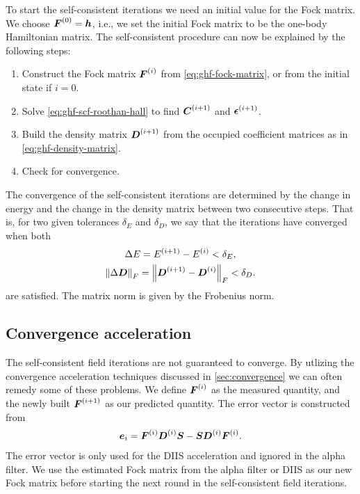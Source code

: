             To start the self-consistent iterations we need an initial value for
            the Fock matrix.
            We choose $\boldsymbol{F}^{(0)} = \boldsymbol{h}$, i.e., we set the initial
            Fock matrix to be the one-body Hamiltonian matrix.
            The self-consistent procedure can now be explained by the following
            steps:
            \begin{enumerate}
                \item Construct the Fock matrix $\boldsymbol{F}^{(i)}$ from
                    \autoref{eq:ghf-fock-matrix}, or from the initial state if
                    $i = 0$.
                \item Solve \autoref{eq:ghf-scf-roothan-hall} to find
                    $\boldsymbol{C}^{(i + 1)}$ and $\boldsymbol{\epsilon}^{(i + 1)}$.
                \item Build the density matrix $\boldsymbol{D}^{(i + 1)}$ from the
                    occupied coefficient matrices as in
                    \autoref{eq:ghf-density-matrix}.
                \item Check for convergence.
            \end{enumerate}
            The convergence of the self-consistent iterations are determined by
            the change in energy and the change in the density matrix between
            two consecutive steps.
            That is, for two given tolerances $\delta_E$ and $\delta_D$, we say
            that the iterations have converged when both
            \begin{gather}
                \Delta E
                = E^{(i + 1)} - E^{(i)} < \delta_E,
                \\
                \norm{\Delta \boldsymbol{D}}_{F}
                = \norm{\boldsymbol{D}^{(i + 1)} - \boldsymbol{D}^{(i)}}_{F}
                < \delta_D.
            \end{gather}
            are satisfied.
            The matrix norm is given by the Frobenius norm.

        \subsection{Convergence acceleration}
            The self-consistent field iterations are not guaranteed to converge.
            By utlizing the convergence acceleration techniques discussed in
            \autoref{sec:convergence} we can often remedy some of these
            problems.
            We define $\boldsymbol{F}^{(i)}$ as the measured quantity, and the newly
            built $\boldsymbol{F}^{(i + 1)}$ as our predicted quantity.
            The error vector is constructed from
            \begin{align}
                \boldsymbol{e}_i
                = \boldsymbol{F}^{(i)} \boldsymbol{D}^{(i)} \boldsymbol{S}
                - \boldsymbol{S} \boldsymbol{D}^{(i)} \boldsymbol{F}^{(i)}.
            \end{align}
            The error vector is only used for the DIIS acceleration and ignored
            in the alpha filter.
            We use the estimated Fock matrix from the alpha filter or DIIS as
            our new Fock matrix before starting the next round in the
            self-consistent field iterations.


